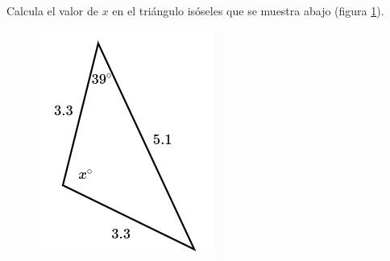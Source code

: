 Calcula el valor de $x$ en el triángulo isóseles  que se muestra abajo (figura \ref{fig:findangle07}).

\begin{minipage}[t][][t]{0.35\textwidth}
    \begin{figure}[H]
        \centering
        \includegraphics[width=0.9\linewidth]{../images/findangle07.png}
        \caption{}
        \label{fig:findangle07}
    \end{figure}
\end{minipage}\hfill

